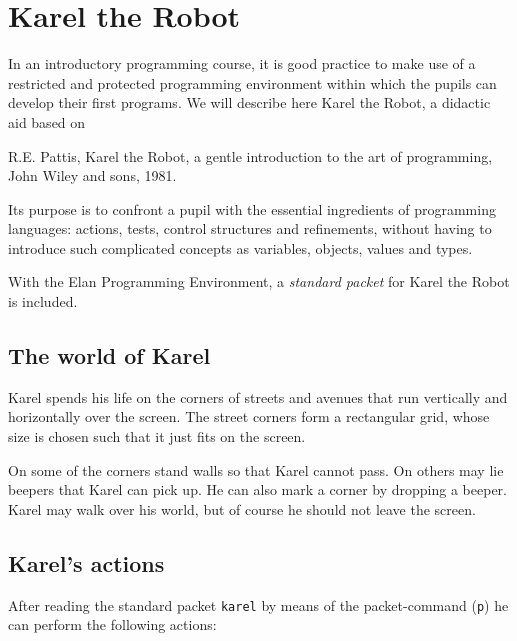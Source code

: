 \section{Karel the Robot}

In an introductory programming course, it is good practice to
make use of a restricted and protected programming environment
within which the pupils can develop their first programs. We
will describe here Karel the Robot, a didactic aid based on

\begin{literal} 
  R.E. Pattis,
  Karel the Robot,
  a gentle introduction to the art of programming,
  John Wiley and sons, 1981.
\end{literal} 

\noindent
Its purpose is to confront a pupil with the essential ingredients
of programming languages: actions, tests, control structures
and refinements, without having to introduce such complicated
concepts as variables, objects, values and types.

With the Elan Programming Environment, a {\em standard packet}
for Karel the Robot is included.

\subsection{The world of Karel}

Karel spends his life on the corners of streets and avenues
that run vertically and horizontally over the screen. The street corners
form a rectangular grid, whose size is chosen such that it just
fits on the screen.

On some of the corners stand walls so that Karel cannot pass.
On others may lie beepers that Karel can pick up. He can also
mark a corner by dropping a beeper. Karel may walk over his world,
but of course he should not leave the screen.

\subsection{Karel's actions}

After reading the standard packet {\tt karel} by means of the
packet-command ({\tt p}) he can perform the following actions:

